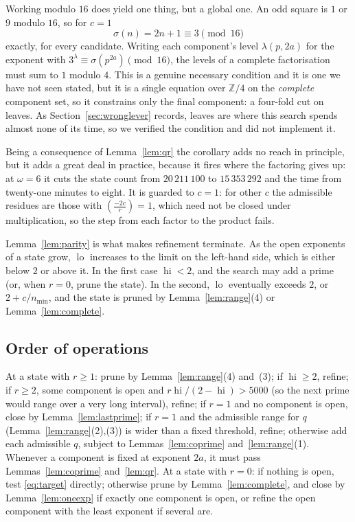 \documentclass[11pt]{amsart}
\theoremstyle{remark}
\DeclareMathOperator{\lo}{lo}
\DeclareMathOperator{\hi}{hi}
\begin{document}
Working modulo $16$ does yield one thing, but a global one. An odd square is
$1$ or $9$ modulo $16$, so for $c = 1$
\[
  \sigma(n) = 2n + 1 \equiv 3 \pmod{16}
\]
exactly, for every candidate. Writing each component's level $\lambda(p, 2a)$
for the exponent with $3^{\lambda} \equiv \sigma(p^{2a}) \pmod{16}$, the levels
of a complete factorisation must sum to $1$ modulo $4$. This is a genuine
necessary condition and it is one we have not seen stated, but it is a single
equation over $\mathbb{Z}/4$ on the \emph{complete} component set, so it
constrains only the final component: a four-fold cut on leaves. As
Section~\ref{sec:wronglever} records, leaves are where this search spends
almost none of its time, so we verified the condition and did not implement it.

Being a consequence of Lemma~\ref{lem:qr} the corollary adds no reach in
principle, but it adds a great deal in practice, because it fires where the
factoring gives up: at $\omega = 6$ it cuts the state count from
$20\,211\,100$ to $15\,353\,292$ and the time from twenty-one minutes to eight.
It is guarded to $c = 1$: for other $c$ the admissible residues are those with
$\left(\frac{-2c}{r}\right) = 1$, which need not be closed under multiplication,
so the step from each factor to the product fails.

Lemma~\ref{lem:parity} is what makes refinement terminate. As the open
exponents of a state grow, $\lo$ increases to the limit on the left-hand side,
which is either below $2$ or above it. In the first case $\hi < 2$, and the
search may add a prime (or, when $r = 0$, prune the state). In the second,
$\lo$ eventually exceeds $2$, or $2 + c/n_{\min}$, and the state is pruned by
Lemma~\ref{lem:range}(4) or Lemma~\ref{lem:complete}.

\subsection{Order of operations}
At a state with $r \ge 1$: prune by Lemma~\ref{lem:range}(4) and~(3); if
$\hi \ge 2$, refine; if $r \ge 2$, some component is open and
$r\hi/(2-\hi) > 5000$ (so the next prime would range over a very long
interval), refine; if $r = 1$ and no component is open, close by
Lemma~\ref{lem:lastprime}; if $r = 1$ and the admissible range for $q$
(Lemma~\ref{lem:range}(2),(3)) is wider than a fixed threshold, refine;
otherwise add each admissible $q$, subject to Lemmas~\ref{lem:coprime}
and~\ref{lem:range}(1). Whenever a component is fixed at exponent $2a$, it must
pass Lemmas~\ref{lem:coprime} and~\ref{lem:qr}. At a state with $r = 0$: if
nothing is open, test
\eqref{eq:target} directly; otherwise prune by Lemma~\ref{lem:complete}, and
close by Lemma~\ref{lem:oneexp} if exactly one component is open, or refine the
open component with the least exponent if several are.
\end{document}
